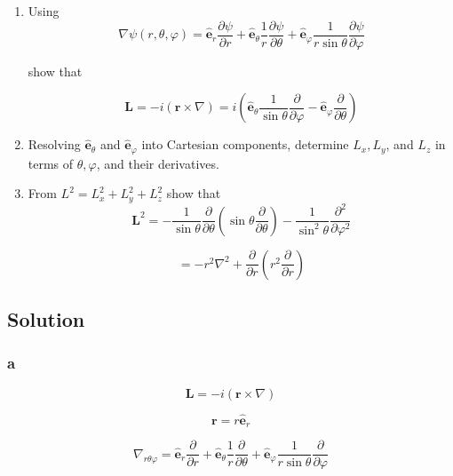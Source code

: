 \documentclass[12pt]{article}
\begin{document}
\begin{enumerate}[label= \textbf{(\alph*)}]
    \item Using
          \[
              \nabla \psi (r, \theta, \varphi) = \hat{\mathbf{e}}_r \frac{\partial \psi}{\partial r}
              + \hat{\mathbf{e}}_\theta \frac{1}{r} \frac{\partial \psi}{\partial \theta}
              + \hat{\mathbf{e}}_\varphi \frac{1}{r \sin{\theta}} \frac{\partial \psi}{\partial \varphi}
          \]

          show that

          \[
              \textbf{L} = -i \left(\textbf{r} \times \nabla\right)
              = i
              \left(
              \hat{\mathbf{e}}_\theta \frac{1}{\sin{\theta}} \frac{\partial}{\partial \varphi}
              - \hat{\mathbf{e}}_\varphi \frac{\partial}{\partial \theta}
              \right)
          \]

    \item Resolving \(\hat{\mathbf{e}}_\theta \) and \(\hat{\mathbf{e}}_\varphi \)
          into Cartesian components, determine \(L_x, L_y\), and \(L_z\) in terms of
          \(\theta , \varphi \), and their derivatives.

    \item From \(L^2 = L_x^2 + L_y^2 + L_z^2\) show that
          \[
              \textbf{L}^2 = -\frac{1}{\sin{\theta}} \frac{\partial}{\partial \theta}
              \left(\sin{\theta} \frac{\partial}{\partial \theta}\right)
              - \frac{1}{\sin^2{\theta}} \frac{\partial^2}{\partial \varphi^2}
          \]

          \[
              = -r^2 \nabla^2 + \frac{\partial}{\partial r} \left(r^2 \frac{\partial}{\partial r}\right)
          \]
\end{enumerate}

\subsection{Solution}

\subsubsection{a}

\[
    \textbf{L} = -i \left(\textbf{r} \times \nabla\right)
\]

\[
    \textbf{r} = r \hat{\mathbf{e}}_r
\]

\[
    \nabla_{r \theta \varphi } = \hat{\mathbf{e}}_r \frac{\partial}{\partial r}
    + \hat{\mathbf{e}}_\theta \frac{1}{r} \frac{\partial}{\partial \theta}
    + \hat{\mathbf{e}}_\varphi \frac{1}{r \sin{\theta}} \frac{\partial}{\partial \varphi}
\]
\end{document}
